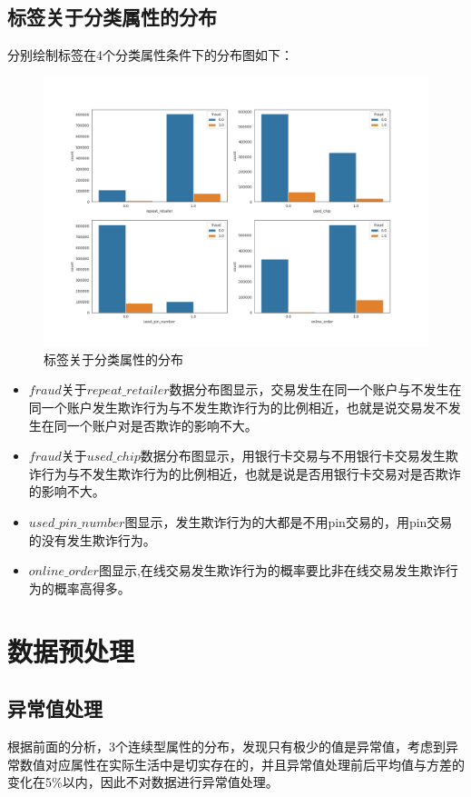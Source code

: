 \subsection{标签关于分类属性的分布}
分别绘制标签在4个分类属性条件下的分布图如下：
\begin{figure}[H]
	\centering
	\includegraphics[scale=0.45,angle=0]{images/6.png}
	\caption{标签关于分类属性的分布}
	\label{6}
\end{figure}
\begin{itemize}
	\item $fraud$关于$repeat\_retailer$数据分布图显示，交易发生在同一个账户与不发生在同一个账户发生欺诈行为与不发生欺诈行为的比例相近，也就是说交易发不发生在同一个账户对是否欺诈的影响不大。
	\item $fraud$关于$used\_chip$数据分布图显示，用银行卡交易与不用银行卡交易发生欺诈行为与不发生欺诈行为的比例相近，也就是说是否用银行卡交易对是否欺诈的影响不大。
	\item $used\_pin\_number$图显示，发生欺诈行为的大都是不用pin交易的，用pin交易的没有发生欺诈行为。
	\item $online\_order$图显示,在线交易发生欺诈行为的概率要比非在线交易发生欺诈行为的概率高得多。
\end{itemize}





\section{数据预处理}
	\subsection{异常值处理}
根据前面的分析，3个连续型属性的分布，发现只有极少的值是异常值，考虑到异常数值对应属性在实际生活中是切实存在的，并且异常值处理前后平均值与方差的变化在5\%以内，因此不对数据进行异常值处理。
